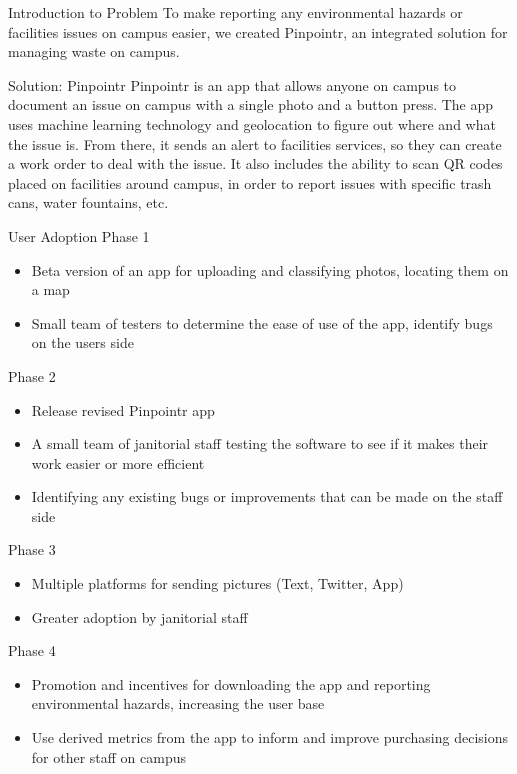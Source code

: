 \documentclass[22pt]{beamer}
\begin{document}
\begin{frame}[fragile]
\begin{textblock}{3.5}
\begin{block}{Introduction to Problem}
To make reporting any environmental hazards or facilities issues on campus easier, we created Pinpointr, an integrated solution for managing waste on campus. 
\end{block}

\begin{block}{Solution: Pinpointr}
Pinpointr is an app that allows anyone on campus to document an issue on campus with a single photo and a button press. The app uses machine learning technology and geolocation to figure out where and what the issue is. From there, it sends an alert to facilities services, so they can create a work order to deal with the issue. It also includes the ability to scan QR codes placed on facilities around campus, in order to report issues with specific trash cans, water fountains, etc.
\end{block}


\begin{block}{User Adoption}
Phase 1
\begin{itemize}
\item Beta version of an app for uploading and classifying photos, locating them on a map
\item Small team of testers to determine the ease of use of the app, identify bugs on the users side
\end{itemize}
Phase 2
\begin{itemize}
\item Release revised Pinpointr app 
\item A small team of janitorial staff testing the software to see if it makes their work easier or more efficient
\item Identifying any existing bugs or improvements that can be made on the staff side
\end{itemize}
Phase 3
\begin{itemize}
\item Multiple platforms for sending pictures (Text, Twitter, App)
\item Greater adoption by janitorial staff
\end{itemize}
Phase 4
\begin{itemize}
\item Promotion and incentives for downloading the app and reporting environmental hazards, increasing the user base
\item Use derived metrics from the app to inform and improve purchasing decisions for other staff on campus
\end{itemize}
\end{block}


\end{textblock}
\end{frame}
\end{document}
